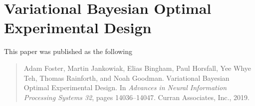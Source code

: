 \documentclass[a4paper, 10pt]{report}
\theoremstyle{plain}
\begin{document}
	
	
	
	
	
	\chapter{Variational Bayesian Optimal Experimental Design}
	\label{chap:vboed}
	This paper was published as the following
	\begin{quote}
		Adam Foster, Martin Jankowiak, Elias Bingham, Paul Horsfall, Yee Whye Teh, Thomas Rainforth, and Noah Goodman. Variational Bayesian Optimal Experimental Design.  In \emph{Advances in Neural Information Processing Systems 32}, pages 14036–14047. Curran Associates, Inc., 2019.
	\end{quote}
	
\end{document}
